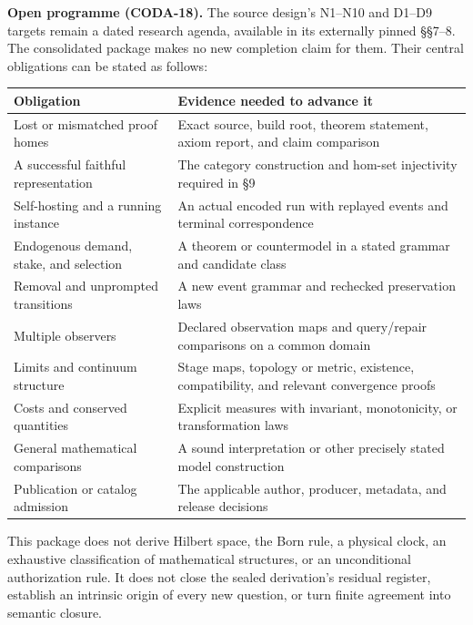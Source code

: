 \documentclass[
  11pt,
]{article}
\begin{document}
\textbf{Open programme (CODA-18).} The source design's N1--N10 and D1--D9 targets remain a dated research agenda, available in its externally pinned §§7--8. The consolidated package makes no new completion claim for them. Their central obligations can be stated as follows:

\begin{longtable}[]{@{}
  >{\raggedright\arraybackslash}p{}
  >{\raggedright\arraybackslash}p{}@{}}
\toprule\noalign{}
\begin{minipage}[b]{\linewidth}\raggedright
Obligation
\end{minipage} & \begin{minipage}[b]{\linewidth}\raggedright
Evidence needed to advance it
\end{minipage} \\
\midrule\noalign{}
\endhead
\bottomrule\noalign{}
\endlastfoot
Lost or mismatched proof homes & Exact source, build root, theorem statement, axiom report, and claim comparison \\
A successful faithful representation & The category construction and hom-set injectivity required in §9 \\
Self-hosting and a running instance & An actual encoded run with replayed events and terminal correspondence \\
Endogenous demand, stake, and selection & A theorem or countermodel in a stated grammar and candidate class \\
Removal and unprompted transitions & A new event grammar and rechecked preservation laws \\
Multiple observers & Declared observation maps and query/repair comparisons on a common domain \\
Limits and continuum structure & Stage maps, topology or metric, existence, compatibility, and relevant convergence proofs \\
Costs and conserved quantities & Explicit measures with invariant, monotonicity, or transformation laws \\
General mathematical comparisons & A sound interpretation or other precisely stated model construction \\
Publication or catalog admission & The applicable author, producer, metadata, and release decisions \\
\end{longtable}

This package does not derive Hilbert space, the Born rule, a physical clock, an exhaustive classification of mathematical structures, or an unconditional authorization rule. It does not close the sealed derivation's residual register, establish an intrinsic origin of every new question, or turn finite agreement into semantic closure.
\end{document}
